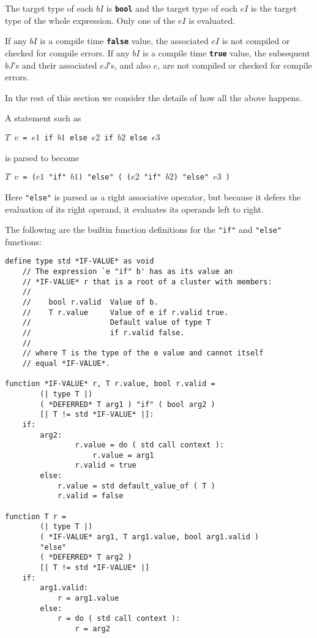 \documentclass[12pt]{article}
\newcommand{\TT}[1]{{\tt \bfseries #1}}
\newenvironment{indpar}[1][0.3in]%
	{\begin{list}{}%
		     {\setlength{\itemsep}{0in}%
		      \setlength{\topsep}{0in}%
		      \setlength{\parsep}{1ex}%
		      \setlength{\labelwidth}{#1}%
		      \setlength{\leftmargin}{#1}%
		      \addtolength{\leftmargin}{\labelsep}}%
	 \item}%
	{\end{list}}
\begin{document}
The target type of each $bI$ is \TT{bool} and the target type of each
$eI$ is the target type of the whole expression.
Only one of the $eI$ is evaluated.

If any $bI$ is a compile time
\TT{false} value, the associated $eI$ is not compiled or checked
for compile errors.
If any $bI$ is a compile time
\TT{true} value, the subsequent $bJ$'s and their associated $eJ$'s,
and also $e$,
are not compiled or checked
for compile errors.

In the rest of this section we consider the details of
how all the above happens.

A statement such as
\begin{center}
\tt $T$ $v$ = $e1$ if $b1$ else $e2$ if $b2$ else $e3$
\end{center}
is parsed to become
\begin{center}
\tt $T$ $v$ = ($e1$ "if" $b1$) "else" ( ($e2$ "if" $b2$) "else" $e3$ )
\end{center}

Here {\tt "else"} is parsed as a right associative operator,
but because it defers the evaluation of its right operand,
it evaluates its operands left to right.

The following are the builtin function definitions for
the {\tt "if"} and {\tt "else" } functions:

\begin{indpar}\begin{verbatim}
define type std *IF-VALUE* as void
    // The expression `e "if" b' has as its value an
    // *IF-VALUE* r that is a root of a cluster with members:
    //
    //    bool r.valid  Value of b.
    //    T r.value     Value of e if r.valid true.
    //                  Default value of type T
    //                  if r.valid false.
    //
    // where T is the type of the e value and cannot itself
    // equal *IF-VALUE*.

function *IF-VALUE* r, T r.value, bool r.valid =
        (| type T |)
        ( *DEFERRED* T arg1 ) "if" ( bool arg2 )
        [| T != std *IF-VALUE* |]:
    if:
        arg2:
                r.value = do ( std call context ):
                    r.value = arg1
                r.valid = true
        else:
            r.value = std default_value_of ( T )
            r.valid = false

function T r =
        (| type T |)
        ( *IF-VALUE* arg1, T arg1.value, bool arg1.valid )
        "else"
        ( *DEFERRED* T arg2 )
        [| T != std *IF-VALUE* |]
    if:
        arg1.valid:
            r = arg1.value
        else:
            r = do ( std call context ):
                r = arg2
\end{verbatim}\end{indpar}
\end{document}
